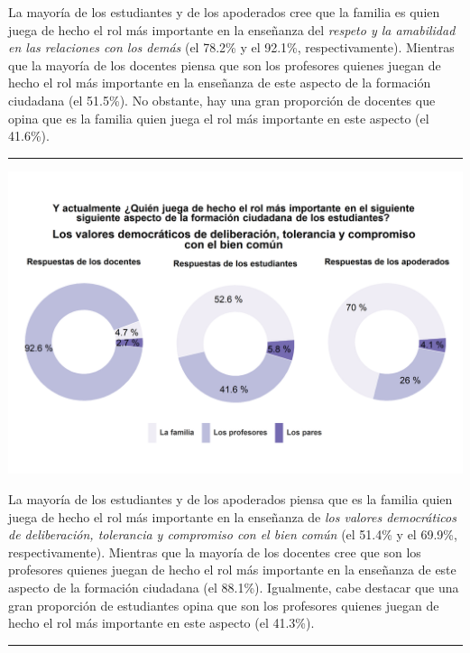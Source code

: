 \documentclass[
  14pt,
]{book}
\let\origfigure\figure
\let\endorigfigure\endfigure
\renewenvironment{figure}[1][2] {
  \expandafter\origfigure\expandafter[H]
} {
  \endorigfigure
}
\begin{document}
La mayoría de los estudiantes y de los apoderados cree que la familia es quien juega de hecho el rol más importante en la enseñanza del \emph{respeto y la amabilidad en las relaciones con los demás} (el 78.2\% y el 92.1\%, respectivamente). Mientras que la mayoría de los docentes piensa que son los profesores quienes juegan de hecho el rol más importante en la enseñanza de este aspecto de la formación ciudadana (el 51.5\%). No obstante, hay una gran proporción de docentes que opina que es la familia quien juega el rol más importante en este aspecto (el 41.6\%).

\begin{center}\rule{0.5\linewidth}{0.5pt}\end{center}

\begin{figure}[!ht]

{\centering \includegraphics[width=0.8\linewidth,]{images/graph_for_ciud8} 

}

\caption{Quién juega el rol más importante en los valores democráticos}\label{fig:unnamed-chunk-32}
\end{figure}

La mayoría de los estudiantes y de los apoderados piensa que es la familia quien juega de hecho el rol más importante en la enseñanza de \emph{los valores democráticos de deliberación, tolerancia y compromiso con el bien común} (el 51.4\% y el 69.9\%, respectivamente). Mientras que la mayoría de los docentes cree que son los profesores quienes juegan de hecho el rol más importante en la enseñanza de este aspecto de la formación ciudadana (el 88.1\%). Igualmente, cabe destacar que una gran proporción de estudiantes opina que son los profesores quienes juegan de hecho el rol más importante en este aspecto (el 41.3\%).

\begin{center}\rule{0.5\linewidth}{0.5pt}\end{center}
\end{document}
